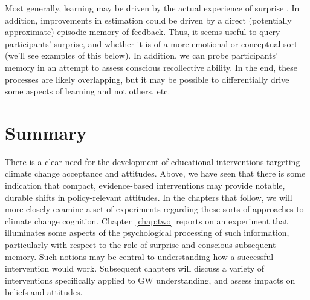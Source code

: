 Most generally, learning may be driven by the actual experience of surprise
\parencite[e.g.,][]{munnich_longevities_2005,kang_wick_2009}.  In addition,
improvements in estimation could be driven by a direct (potentially approximate)
episodic memory of feedback. Thus, it seems useful to query participants'
surprise, and whether it is of a more emotional or conceptual sort (we'll see
examples of this below). In addition, we can probe participants' memory in an
attempt to assess conscious recollective ability. In the end, these processes
are likely overlapping, but it may be possible to differentially drive some
aspects of learning and not others, etc.

\section{Summary}

There is a clear need for the development of educational interventions targeting
climate change acceptance and attitudes. Above, we have seen that there is some
indication that compact, evidence-based interventions may provide notable,
durable shifts in policy-relevant attitudes. In the chapters that follow, we
will more closely examine a set of experiments regarding these sorts of
approaches to climate change cognition. Chapter~\ref{chap:two} reports on an
experiment that illuminates some aspects of the psychological processing of such
information, particularly with respect to the role of surprise and conscious
subsequent memory. Such notions may be central to understanding how a successful
intervention would work. Subsequent chapters will discuss a variety of
interventions specifically applied to GW understanding, and assess impacts on
beliefs and attitudes.



